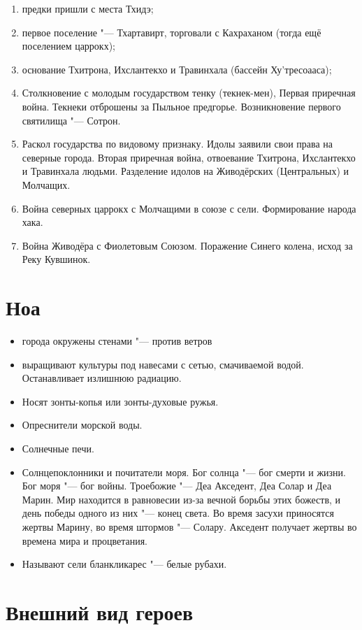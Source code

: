 \documentclass[a4paper,10pt]{book}
\begin{document}
\begin{enumerate}
\item предки пришли с места Тхидэ;
\item первое поселение "--- Тхартавирт, торговали с Кахраханом (тогда ещё 
поселением 
царрокх);
\item основание Тхитрона, Ихслантекхо и Травинхала (бассейн Ху'тресоааса);
\item Столкновение с молодым государством тенку (текнек-мен), Первая приречная 
война. 
Текнеки отброшены за Пыльное предгорье. Возникновение первого святилища "--- 
Сотрон.
\item Раскол государства по видовому признаку. Идолы заявили свои права на 
северные 
города. Вторая приречная война, отвоевание Тхитрона, Ихслантекхо и Травинхала 
людьми. Разделение идолов на Живодёрских (Центральных) и Молчащих.
\item Война северных царрокх с Молчащими в союзе с сели. Формирование народа 
хака.
\item Война Живодёра с Фиолетовым Союзом. Поражение Синего колена, исход за 
Реку 
Кувшинок.
\end{enumerate}

\section{Ноа}

\begin{itemize}
\item города окружены стенами "--- против ветров
\item выращивают культуры под навесами с сетью, смачиваемой водой. 
Останавливает 
излишнюю радиацию.
\item Носят зонты-копья или зонты-духовые ружья.
\item Опреснители морской воды.
\item Солнечные печи.
\item Солнцепоклонники и почитатели моря. Бог солнца "--- бог смерти и жизни. 
Бог моря "--- бог войны. Троебожие "--- Деа Акседент, Деа Солар и Деа Марин. 
Мир 
находится в равновесии из-за вечной борьбы этих божеств, и день победы одного 
из 
них "--- конец света. Во время засухи приносятся жертвы Марину, во время 
штормов 
"--- Солару. Акседент получает жертвы во времена мира и процветания.
\item Называют сели бланкликарес "--- белые рубахи.
\end{itemize}


\section{Внешний вид героев}
\end{document}
